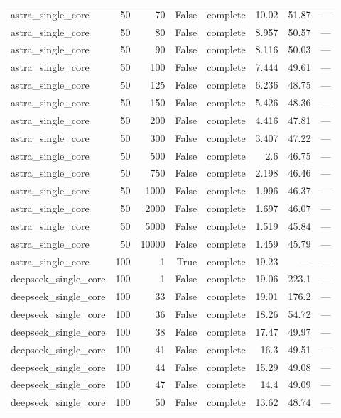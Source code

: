 \begin{tabular}{lrrrlrrl}
astra\_single\_core & 50 & 70 & False & complete & 10.02 & 51.87 & — \\
astra\_single\_core & 50 & 80 & False & complete & 8.957 & 50.57 & — \\
astra\_single\_core & 50 & 90 & False & complete & 8.116 & 50.03 & — \\
astra\_single\_core & 50 & 100 & False & complete & 7.444 & 49.61 & — \\
astra\_single\_core & 50 & 125 & False & complete & 6.236 & 48.75 & — \\
astra\_single\_core & 50 & 150 & False & complete & 5.426 & 48.36 & — \\
astra\_single\_core & 50 & 200 & False & complete & 4.416 & 47.81 & — \\
astra\_single\_core & 50 & 300 & False & complete & 3.407 & 47.22 & — \\
astra\_single\_core & 50 & 500 & False & complete & 2.6 & 46.75 & — \\
astra\_single\_core & 50 & 750 & False & complete & 2.198 & 46.46 & — \\
astra\_single\_core & 50 & 1000 & False & complete & 1.996 & 46.37 & — \\
astra\_single\_core & 50 & 2000 & False & complete & 1.697 & 46.07 & — \\
astra\_single\_core & 50 & 5000 & False & complete & 1.519 & 45.84 & — \\
astra\_single\_core & 50 & 10000 & False & complete & 1.459 & 45.79 & — \\
astra\_single\_core & 100 & 1 & True & complete & 19.23 & — & — \\
deepseek\_single\_core & 100 & 1 & False & complete & 19.06 & 223.1 & — \\
deepseek\_single\_core & 100 & 33 & False & complete & 19.01 & 176.2 & — \\
deepseek\_single\_core & 100 & 36 & False & complete & 18.26 & 54.72 & — \\
deepseek\_single\_core & 100 & 38 & False & complete & 17.47 & 49.97 & — \\
deepseek\_single\_core & 100 & 41 & False & complete & 16.3 & 49.51 & — \\
deepseek\_single\_core & 100 & 44 & False & complete & 15.29 & 49.08 & — \\
deepseek\_single\_core & 100 & 47 & False & complete & 14.4 & 49.09 & — \\
deepseek\_single\_core & 100 & 50 & False & complete & 13.62 & 48.74 & — \\

\end{tabular}
